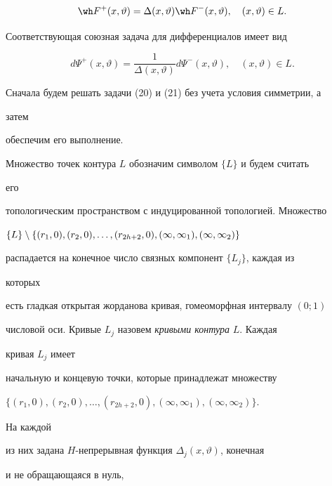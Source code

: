 \begin{equation} 


\wh F^+(x,\vartheta)=\Delta(x,\vartheta)\wh F^-(x,\vartheta), 


\quad (x,\vartheta)\in L. 


\end{equation} 


Соответствующая союзная задача для дифференциалов имеет вид 


\begin{equation} 


d\Psi^+(x,\vartheta)=\frac{1}{\Delta(x,\vartheta)} 


d\Psi^-(x,\vartheta),\quad (x,\vartheta)\in L. 


\end{equation} 


Сначала будем решать задачи (20) и (21) без учета условия симметрии, а 


затем 


обеспечим его выполнение. 


 


Множество точек контура $L$ обозначим символом $\{L\}$ и будем считать 


его 


топологическим пространством с индуцированной топологией. Множество 


$\{L\}\setminus\{(r_1,0),(r_2,0),\dotsc,(r_{2h+2},0),\linebreak


(\infty,\infty_1),(\infty,\infty_2)\}$ 


распадается на конечное число связных компонент $\{L_j\}$, каждая из 


которых 


есть гладкая открытая жорданова кривая, гомеоморфная интервалу $(0;1)$ 


числовой оси. Кривые $L_j$ назовем {\it кривыми контура} $L$. Каждая 


кривая $L_j$ имеет 


начальную и концевую точки, которые принадлежат множеству 


$\{(r_1,0),(r_2,0),\dotsc,(r_{2h+2},0),


(\infty,\infty_1),(\infty,\infty_2)\}$. 


На каждой 


из них задана $H$-непрерывная функция $\Delta_j(x,\vartheta)$, конечная 


и не обращающаяся в нуль, 


